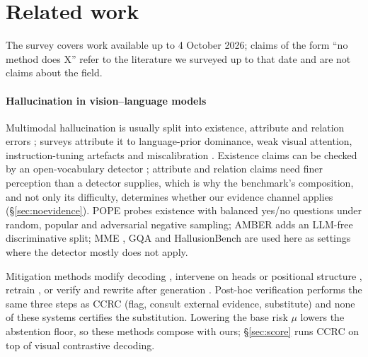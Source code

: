 \section{Related work}
\label{sec:related}

The survey covers work available up to 4 October 2026; claims of the form ``no method does X'' refer
to the literature we surveyed up to that date and are not claims about the field.

\paragraph{Hallucination in vision--language models}
Multimodal hallucination is usually split into existence, attribute and relation errors
\citep{amber}; surveys \citep{bai2024survey,liu2024survey,ji2023} attribute it to language-prior
dominance, weak visual attention, instruction-tuning artefacts \citep{liu2023lrv} and
miscalibration \citep{guo2017}. Existence claims can be checked by an open-vocabulary detector
\citep{owlv2,liu2024groundingdino}; attribute and relation claims need finer perception than a
detector supplies, which is why the benchmark's composition, and not only its difficulty,
determines whether our evidence channel applies (\S\ref{sec:noevidence}). POPE \citep{pope}
probes existence with balanced yes/no questions under random, popular and adversarial negative
sampling; AMBER \citep{amber} adds an LLM-free discriminative split; MME \citep{mme}, GQA
\citep{gqa} and HallusionBench \citep{hallusionbench} are used here as settings where the detector
mostly does not apply.

Mitigation methods modify decoding \citep{opera,vcd,chen2024halc,favero2024,degf,marine},
intervene on heads or positional structure \citep{attnlens,only,maskcd,causalgating,mcallava},
retrain \citep{sun2024aligning,yu2024rlhfv,liu2023lrv}, or verify and rewrite after generation
\citep{woodpecker,lure,reverse,mkgrag,rule,cmvkgguard}. Post-hoc verification performs the same
three steps as CCRC (flag, consult external evidence, substitute) and none of these systems
certifies the substitution. Lowering the base risk $\mu$ lowers the abstention floor, so these
methods compose with ours; \S\ref{sec:score} runs CCRC on top of visual contrastive decoding.

